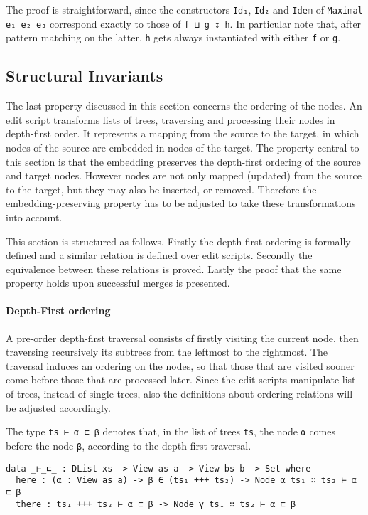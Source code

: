 \documentclass[../Thesis.tex]{subfiles}
\begin{document}
	The proof is straightforward, since the constructors \texttt{Id₁}, \texttt{Id₂} 
	and \texttt{Idem} of \texttt{Maximal e₁ e₂ e₃} correspond exactly to those
	of \texttt{f ⊔ g ↧ h}.
	In particular note that, after pattern matching on the latter, \texttt{h} gets
	always instantiated with either \texttt{f} or \texttt{g}.
		
	\subsection{Structural Invariants}
	\label{subsec:Embedding}
	The last property discussed in this section concerns the ordering of 
	the nodes. An edit script transforms lists of trees, traversing and processing 
	their nodes in depth-first order.
	It represents a mapping from the source to the target, in which 
	nodes of the source are embedded in nodes of the target.
	The property central to this section is that the 
	embedding preserves the depth-first ordering of the 
	source and target nodes.
	However nodes are not only mapped (updated) from the source to the 
	target, but they may also be inserted, or removed. 
	Therefore the embedding-preserving property has to be adjusted to
	take these transformations into account.
	
	This section is structured as follows. Firstly the depth-first ordering
	is formally defined and a similar relation is defined over
	edit scripts. Secondly the equivalence
	between these relations is proved. Lastly the proof that the same 
	property holds upon successful merges is presented.
	
	\paragraph{Depth-First ordering}
	A pre-order depth-first traversal consists of
	firstly visiting the current node, then traversing recursively its subtrees 	
	from the leftmost to the rightmost.
	The traversal induces an ordering on the nodes, so that those that
	are visited sooner come before those that are processed later.
	Since the edit scripts manipulate list of trees, instead of single trees,
	also the definitions about ordering relations will be adjusted accordingly.

	The type \texttt{ts ⊢ α ⊏ β} denotes that, in the list of trees \texttt{ts}, 
	the node \texttt{α} comes before the node \texttt{β}, according to the
	depth first traversal.
	
\begin{verbatim}
data _⊢_⊏_ : DList xs -> View as a -> View bs b -> Set where
  here : (α : View as a) -> β ∈ (ts₁ +++ ts₂) -> Node α ts₁ ∷ ts₂ ⊢ α ⊏ β
  there : ts₁ +++ ts₂ ⊢ α ⊏ β -> Node γ ts₁ ∷ ts₂ ⊢ α ⊏ β
\end{verbatim}
\end{document}
